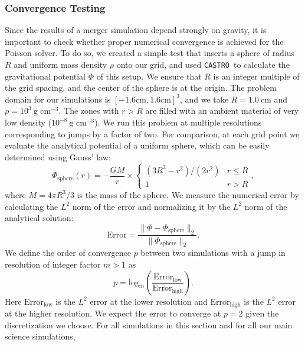\documentclass[iop]{../emulateapj}
\newcommand{\castro}{\texttt{CASTRO}}
\begin{document}
\subsubsection{Convergence Testing}\label{sec:gravity_convergence_testing}

Since the results of a merger simulation depend strongly on gravity,
it is important to check whether proper numerical convergence is
achieved for the Poisson solver. To do so, we created a simple test
that inserts a sphere of radius $R$ and uniform mass density $\rho$
onto our grid, and used \castro\ to calculate the gravitational
potential $\Phi$ of this setup. We ensure that $R$ is an integer
multiple of the grid spacing, and the center of the sphere is at the
origin. The problem domain for our simulations is $[-1.6 \text{cm}, 1.6 \text{cm}]^3$, and
we take $R = 1.0\ \text{cm}$ and $\rho = 10^3\ \text{g cm}^{-3}$. 
The zones with $r > R$ are filled with an ambient material of very low density 
($10^{-8}\ \text{g cm}^{-3}$). We run this problem at multiple 
resolutions corresponding to jumps by a factor of two. For
comparison, at each grid point we evaluate the analytical potential of
a uniform sphere, which can be easily determined using Gauss' law:
\begin{equation}
  \Phi_{\text{sphere}}(r) = -\frac{GM}{r} \times \begin{cases} (3R^2 - r^2)/(2 r^2) & r \leq R \\ 1 & r > R \end{cases},\label{eq:sphere-analytical}
\end{equation}
where $M = 4\pi R^3 / 3$ is the mass of the sphere. We measure the 
numerical error by calculating the $L^2$ norm of the error and 
normalizing it by the $L^2$ norm of the analytical solution:
\begin{equation}
  \text{Error} = \frac{\|\Phi - \Phi_{\text{sphere}}\|_2}{\|\Phi_{\text{sphere}}\|_2}.
\end{equation}
We define the order of convergence $p$ between two simulations with a jump 
in resolution of integer factor $m > 1$ as
\begin{equation}
  p = \text{log}_{m}\left(\frac{\text{Error}_{\text{low}}}{\text{Error}_{\text{high}}}\right).
\end{equation}
Here $\text{Error}_{\text{low}}$ is the $L^2$ error at the lower resolution 
and $\text{Error}_{\text{high}}$ is the $L^2$ error at the higher resolution.
We expect the error to converge at $p = 2$ given the discretization we choose. 
For all simulations in this section and for all our main science simulations,
\end{document}
